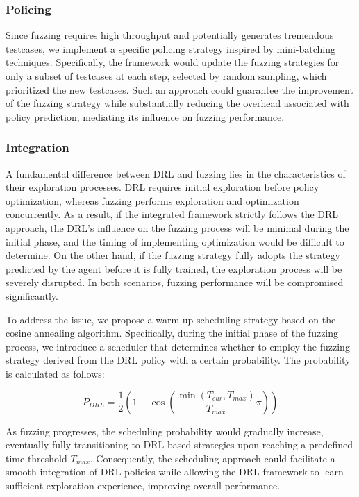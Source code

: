 \documentclass[lettersize,journal]{IEEEtran}
\begin{document}
\subsubsection{Policing}
Since fuzzing requires high throughput and potentially generates tremendous testcases, we implement a specific policing strategy inspired by mini-batching techniques. Specifically, the framework would update the fuzzing strategies for only a subset of testcases at each step, selected by random sampling, which prioritized the new testcases. Such an approach could guarantee the improvement of the fuzzing strategy while substantially reducing the overhead associated with policy prediction, mediating its influence on fuzzing performance.

\subsubsection{Integration}\label{subsubsec:integration}

A fundamental difference between DRL and fuzzing lies in the characteristics of their exploration processes. DRL requires initial exploration before policy optimization, whereas fuzzing performs exploration and optimization concurrently. As a result, if the integrated framework strictly follows the DRL approach, the DRL's influence on the fuzzing process will be minimal during the initial phase, and the timing of implementing optimization would be difficult to determine. On the other hand, if the fuzzing strategy fully adopts the strategy predicted by the agent before it is fully trained, the exploration process will be severely disrupted. In both scenarios, fuzzing performance will be compromised significantly.

To address the issue, we propose a warm-up scheduling strategy based on the cosine annealing algorithm. Specifically, during the initial phase of the fuzzing process, we introduce a scheduler that determines whether to employ the fuzzing strategy derived from the DRL policy with a certain probability. The probability is calculated as follows:

\begin{equation}
	P_{\textit{DRL}} = \frac{1}{2}\left(1 - \cos\left(\frac{\min(T_{\textit{cur}}, T_{\textit{max}})}{T_{\textit{max}}}\pi\right)\right)
	\label{eq:cosine_scheduling}
\end{equation}

As fuzzing progresses, the scheduling probability would gradually increase, eventually fully transitioning to DRL-based strategies upon reaching a predefined time threshold $T_{\textit{max}}$. Consequently, the scheduling approach could facilitate a smooth integration of DRL policies while allowing the DRL framework to learn sufficient exploration experience, improving overall performance.
\end{document}
